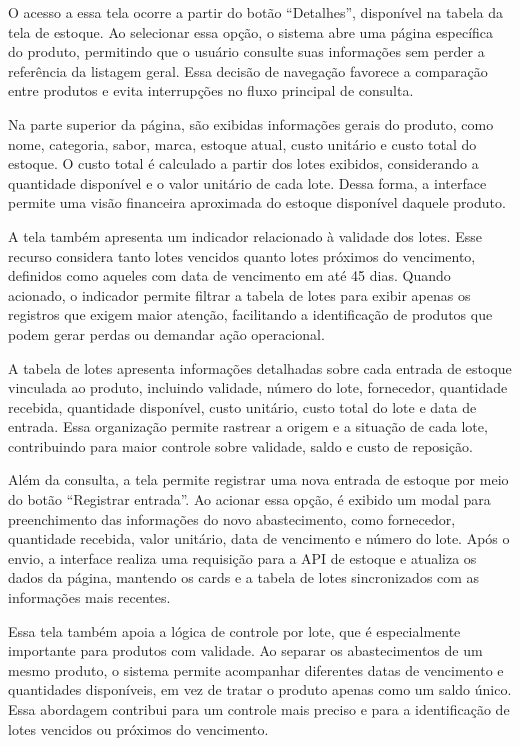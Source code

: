 O acesso a essa tela ocorre a partir do botão ``Detalhes'', disponível na tabela da tela de estoque. Ao selecionar essa opção, o sistema abre uma página específica do produto, permitindo que o usuário consulte suas informações sem perder a referência da listagem geral. Essa decisão de navegação favorece a comparação entre produtos e evita interrupções no fluxo principal de consulta.

Na parte superior da página, são exibidas informações gerais do produto, como nome, categoria, sabor, marca, estoque atual, custo unitário e custo total do estoque. O custo total é calculado a partir dos lotes exibidos, considerando a quantidade disponível e o valor unitário de cada lote. Dessa forma, a interface permite uma visão financeira aproximada do estoque disponível daquele produto.

A tela também apresenta um indicador relacionado à validade dos lotes. Esse recurso considera tanto lotes vencidos quanto lotes próximos do vencimento, definidos como aqueles com data de vencimento em até 45 dias. Quando acionado, o indicador permite filtrar a tabela de lotes para exibir apenas os registros que exigem maior atenção, facilitando a identificação de produtos que podem gerar perdas ou demandar ação operacional.

A tabela de lotes apresenta informações detalhadas sobre cada entrada de estoque vinculada ao produto, incluindo validade, número do lote, fornecedor, quantidade recebida, quantidade disponível, custo unitário, custo total do lote e data de entrada. Essa organização permite rastrear a origem e a situação de cada lote, contribuindo para maior controle sobre validade, saldo e custo de reposição.

Além da consulta, a tela permite registrar uma nova entrada de estoque por meio do botão ``Registrar entrada''. Ao acionar essa opção, é exibido um modal para preenchimento das informações do novo abastecimento, como fornecedor, quantidade recebida, valor unitário, data de vencimento e número do lote. Após o envio, a interface realiza uma requisição para a API de estoque e atualiza os dados da página, mantendo os cards e a tabela de lotes sincronizados com as informações mais recentes.

Essa tela também apoia a lógica de controle por lote, que é especialmente importante para produtos com validade. Ao separar os abastecimentos de um mesmo produto, o sistema permite acompanhar diferentes datas de vencimento e quantidades disponíveis, em vez de tratar o produto apenas como um saldo único. Essa abordagem contribui para um controle mais preciso e para a identificação de lotes vencidos ou próximos do vencimento.

